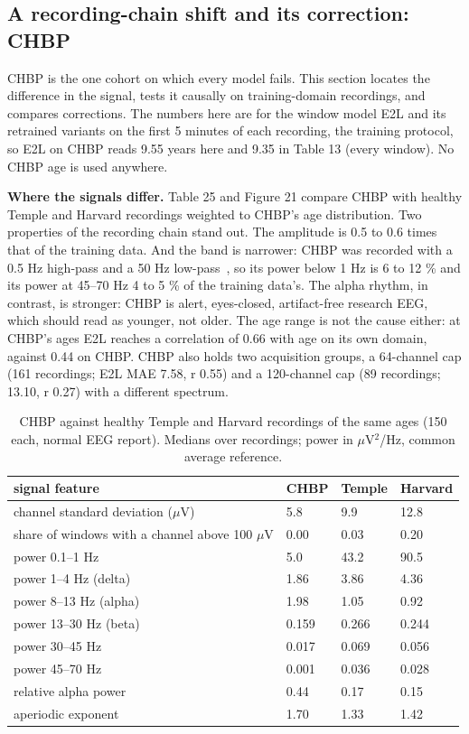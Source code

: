 \documentclass[11pt,a4paper]{article}
\begin{document}
\subsection{A recording-chain shift and its correction: CHBP}

CHBP is the one cohort on which every model fails. This section locates the difference in the signal, tests it causally on training-domain recordings, and compares corrections. The numbers here are for the window model E2L and its retrained variants on the first 5 minutes of each recording, the training protocol, so E2L on CHBP reads 9.55 years here and 9.35 in Table 13 (every window). No CHBP age is used anywhere.

\textbf{Where the signals differ.} Table 25 and Figure 21 compare CHBP with healthy Temple and Harvard recordings weighted to CHBP's age distribution. Two properties of the recording chain stand out. The amplitude is 0.5 to 0.6 times that of the training data. And the band is narrower: CHBP was recorded with a 0.5 Hz high-pass and a 50 Hz low-pass~\citep{valdessosa2021chbp}, so its power below 1 Hz is 6 to 12 \% and its power at 45--70 Hz 4 to 5 \% of the training data's. The alpha rhythm, in contrast, is stronger: CHBP is alert, eyes-closed, artifact-free research EEG, which should read as younger, not older. The age range is not the cause either: at CHBP's ages E2L reaches a correlation of 0.66 with age on its own domain, against 0.44 on CHBP. CHBP also holds two acquisition groups, a 64-channel cap (161 recordings; E2L MAE 7.58, r 0.55) and a 120-channel cap (89 recordings; 13.10, r 0.27) with a different spectrum.

\begin{table}[t]
\centering
\small
\caption{CHBP against healthy Temple and Harvard recordings of the same ages (150 each, normal EEG report). Medians over recordings; power in $\mu$V$^2$/Hz, common average reference.}
\begin{tabular}{llll}
\toprule
\textbf{signal feature} & \textbf{CHBP} & \textbf{Temple} & \textbf{Harvard} \\
\midrule
channel standard deviation ($\mu$V) & 5.8 & 9.9 & 12.8 \\
share of windows with a channel above 100 $\mu$V & 0.00 & 0.03 & 0.20 \\
power 0.1--1 Hz & 5.0 & 43.2 & 90.5 \\
power 1--4 Hz (delta) & 1.86 & 3.86 & 4.36 \\
power 8--13 Hz (alpha) & 1.98 & 1.05 & 0.92 \\
power 13--30 Hz (beta) & 0.159 & 0.266 & 0.244 \\
power 30--45 Hz & 0.017 & 0.069 & 0.056 \\
power 45--70 Hz & 0.001 & 0.036 & 0.028 \\
relative alpha power & 0.44 & 0.17 & 0.15 \\
aperiodic exponent & 1.70 & 1.33 & 1.42 \\
\bottomrule
\end{tabular}
\end{table}
\end{document}
